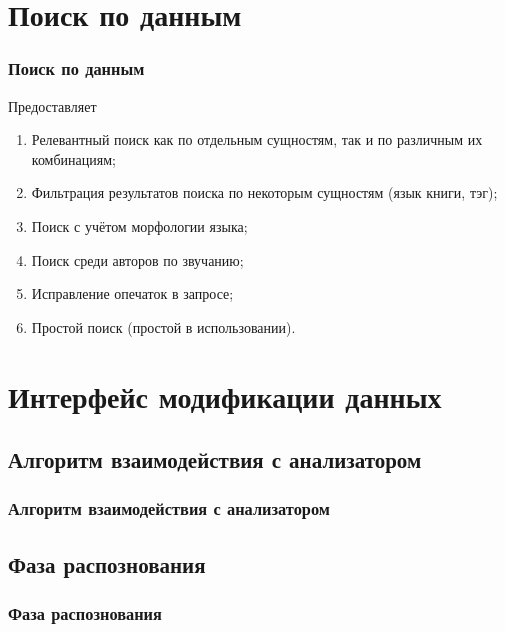 \documentclass[utf8,handout]{beamer}
\begin{document}
\section{Поиск по данным}
	\begin{frame}
 		\frametitle{Поиск по данным}
 		\begin{block}{}
			Предоставляет
			\begin{enumerate}
				\item  Релевантный поиск как по отдельным сущностям, так и по различным их комбинациям;
				\item  Фильтрация результатов поиска по некоторым сущностям (язык книги, тэг);
				\item  Поиск с учётом морфологии языка;
				\item  Поиск среди авторов по звучанию;
				\item  Исправление опечаток в запросе;
				\item  Простой поиск (простой в использовании).
			\end{enumerate}
		\end{block}
	\end{frame}
	

\section{Интерфейс модификации данных}
	\subsection{Алгоритм взаимодействия с анализатором}
	\begin{frame}
 		\frametitle{Алгоритм взаимодействия с анализатором}
	\end{frame}
	
	\subsection{Фаза распознования}
	\begin{frame}
 		\frametitle{Фаза распознования}
 	\end{frame}
\end{document}
